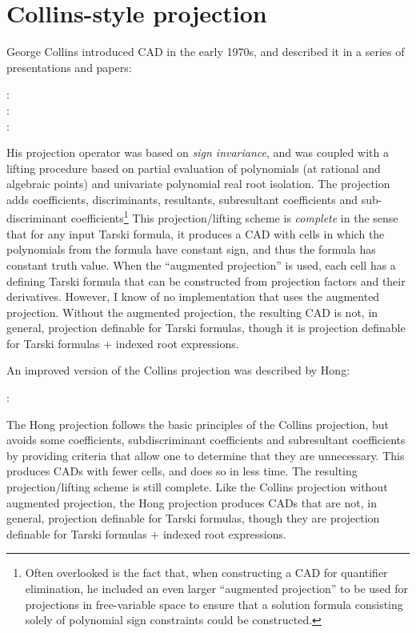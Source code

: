 \documentclass{article}
\begin{document}
\section{Collins-style projection}
George Collins introduced CAD in the early 1970s, and described it in
a series of presentations and papers:
%
\begin{description}
\item[\autocite{Collins:73b} :]  
\item[\autocite{Collins:74b} :]  
\item[\autocite{Collins:75} :]  
\end{description}
%
His projection operator was based on \emph{sign invariance}, and was
coupled with a lifting procedure based on partial evaluation of
polynomials (at rational and algebraic points) and univariate
polynomial real root isolation.  The projection adds coefficients,
discriminants, resultants, subresultant coefficients and
sub-discriminant coefficients\footnote{Often overlooked is the fact that,
when constructing a CAD for quantifier elimination,
he included an even larger ``augmented projection'' to be used for
projections in free-variable space to ensure that a solution formula
consisting solely of polynomial sign constraints could be
constructed.}
This projection/lifting scheme is \emph{complete} in
the sense that for any input Tarski formula, it produces a CAD with
cells in which the polynomials from the formula have constant sign,
and thus the formula has constant truth value.  When the ``augmented
projection'' is used, each cell has a defining Tarski formula that can be
constructed from projection factors and their derivatives.  However, I
know of no implementation that uses the augmented projection.  Without
the augmented projection, the resulting CAD is not, in general,
projection definable for Tarski formulas, though it is projection
definable for Tarski formulas + indexed root expressions.


An improved version of the Collins projection was described by Hong:
%
\begin{description}
\item[\autocite{Hong:90a} :]  
\end{description}
%
The Hong projection follows the basic principles of the Collins
projection, but avoids some coefficients, subdiscriminant coefficients
and subresultant coefficients by providing criteria that allow one to
determine that they are unnecessary.  This produces CADs with fewer
cells, and does so in less time.  The resulting projection/lifting
scheme is still complete.  Like the Collins projection without
augmented projection, the Hong projection produces CADs that are not,
in general,
projection definable for Tarski formulas, though they are projection
definable for Tarski formulas + indexed root expressions.
\end{document}
